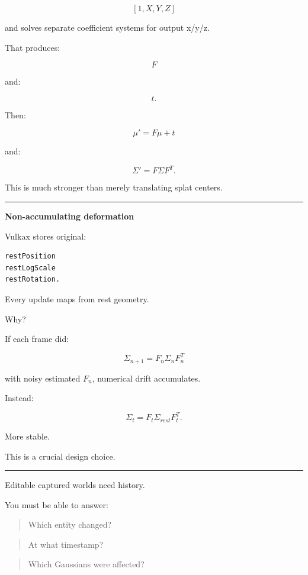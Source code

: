\[
[1,X,Y,Z]
\]

and solves separate coefficient systems for output x/y/z.

That produces:

\[
F
\]

and:

\[
t.
\]

Then:

\[
\mu'=
F\mu+t
\]

and:

\[
\Sigma'
=
F\Sigma F^T.
\]

This is much stronger than merely translating splat centers.

\begin{center}\rule{0.5\linewidth}{0.5pt}\end{center}

\textbf{Non-accumulating deformation}

Vulkax stores original:

\protect{}\label{npbq8r}%
\begin{verbatim}
restPosition
restLogScale
restRotation.
\end{verbatim}

Every update maps from rest geometry.

Why?

If each frame did:

\[
\Sigma_{n+1}
=
F_n
\Sigma_n
F_n^T
\]

with noisy estimated \(F_n\), numerical drift accumulates.

Instead:

\[
\boxed{
\Sigma_t
=
F_t
\Sigma_{rest}
F_t^T.
}
\]

More stable.

This is a crucial design choice.

\begin{center}\rule{0.5\linewidth}{0.5pt}\end{center}

Editable captured worlds need history.

You must be able to answer:

\begin{quote}
Which entity changed?
\end{quote}

\begin{quote}
At what timestamp?
\end{quote}

\begin{quote}
Which Gaussians were affected?
\end{quote}

